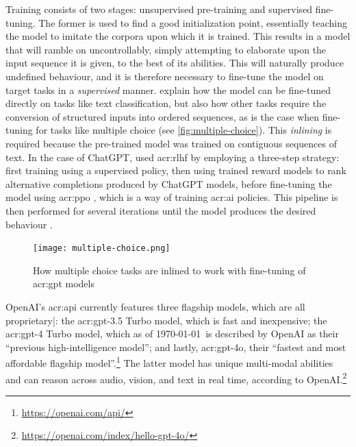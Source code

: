 Training consists of two stages: unsupervised pre-training and supervised fine-tuning. The former is used to find a good initialization point, essentially teaching the model to imitate the corpora upon which it is trained. This results in a model that will ramble on uncontrollably, simply attempting to elaborate upon the input sequence it is given, to the best of its abilities. This will naturally produce undefined behaviour, and it is therefore necessary to fine-tune the model on target tasks in a \textit{supervised} manner. \cite[4]{radfordImprovingLanguageUnderstanding2018} explain how the model can be fine-tuned directly on tasks like text classification, but also how other tasks require the conversion of structured inputs into ordered sequences, as is the case when fine-tuning for tasks like multiple choice (see \autoref{fig:multiple-choice}). This \textit{inlining} is required because the pre-trained model was trained on contiguous sequences of text. In the case of ChatGPT, \citeauthor{openaiIntroducingChatGPT2022} used \gls{acr:rlhf} \citep{christianoDeepReinforcementLearning2023} by employing a three-step strategy: first training using a supervised policy, then using trained reward models to rank alternative completions produced by ChatGPT models, before fine-tuning the model using \gls{acr:ppo} \citep{schulmanProximalPolicyOptimization2017}, which is a way of training \acrshort{acr:ai} policies. This pipeline is then performed for several iterations until the model produces the desired behaviour \citep{openaiIntroducingChatGPT2022}.

\begin{figure}
    \centering
    \texttt{[image: multiple-choice.png]}
    \caption{How multiple choice tasks are inlined to work with fine-tuning of \acrshort{acr:gpt} models \citep[4]{radfordImprovingLanguageUnderstanding2018}}
    \label{fig:multiple-choice}
\end{figure}

OpenAI's \acrshort{acr:api} currently features three flagship models, which are all proprietary|: the \acrshort{acr:gpt}-3.5 Turbo model, which is fast and inexpensive; the \acrshort{acr:gpt}-4 Turbo model, which as of \today~is described by OpenAI as their \enquote{previous high-intelligence model}; and lastly, \acrshort{acr:gpt}-4o, their \enquote{fastest and most affordable flagship model}.\footnote{\url{https://openai.com/api/}} The latter model has unique multi-modal abilities and can reason across audio, vision, and text in real time, according to OpenAI.\footnote{\url{https://openai.com/index/hello-gpt-4o/}}

